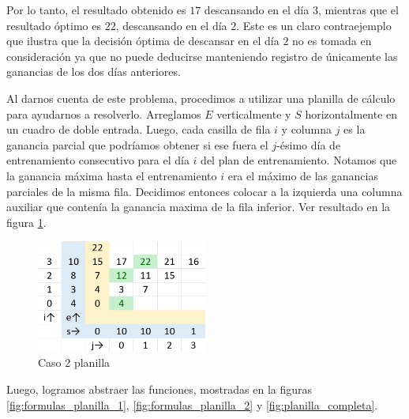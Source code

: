 Por lo tanto, el resultado obtenido es $17$ descansando en el día $3$, mientras que el resultado
óptimo es $22$, descansando en el día $2$. Este es un claro contraejemplo que ilustra que la decisión
óptima de descansar en el día $2$ no es tomada en consideración ya que no puede deducirse manteniendo
registro de únicamente las ganancias de los dos días anteriores. 

Al darnos cuenta de este problema, procedimos a utilizar una planilla de cálculo para ayudarnos a resolverlo.
Arreglamos $E$ verticalmente y $S$ horizontalmente en un cuadro de doble entrada. Luego, cada
casilla de fila $i$ y columna $j$ es la ganancia parcial que podríamos obtener si ese fuera el $j$-ésimo día
de entrenamiento consecutivo para el día $i$ del plan de entrenamiento. Notamos que la ganancia
máxima hasta el entrenamiento $i$ era el máximo de las ganancias parciales de la misma fila.
Decidimos entonces colocar a la izquierda una columna auxiliar que contenía la ganancia maxima
de la fila inferior. Ver resultado en la figura \ref{fig:planilla_caso_2}.

\begin{figure}[H]
    \centering
    \includegraphics[width=0.5\textwidth]{img/planilla_caso_2.png}
    \caption{Caso 2 planilla}
    \label{fig:planilla_caso_2}
\end{figure}

Luego, logramos abstraer las funciones, mostradas en la figuras \ref{fig:formulas_planilla_1},
\ref{fig:formulas_planilla_2} y \ref{fig:planilla_completa}.

